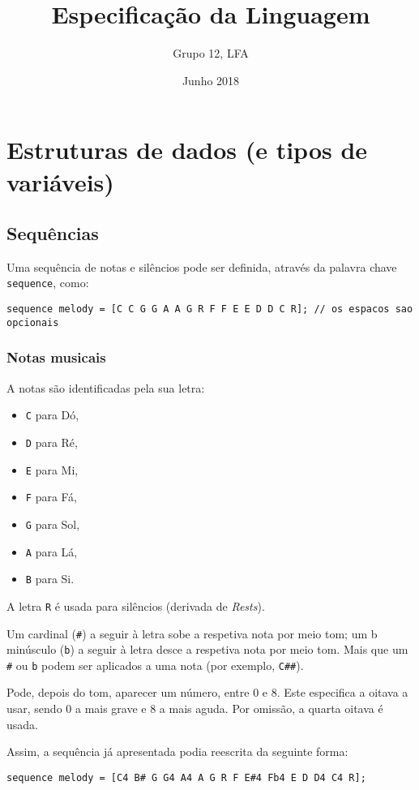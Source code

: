 \documentclass{article}
\title{Especificação da Linguagem}
\author{Grupo 12, LFA}
\date{Junho 2018}
\begin{document}
\maketitle

\tableofcontents
\vspace{2cm} %

\section{Estruturas de dados (e tipos de variáveis)} \label{variables}
\subsection{Sequências}
Uma sequência de notas e silêncios pode ser definida, através da palavra chave \texttt{sequence}, como:
\begin{lstlisting} 
sequence melody = [C C G G A A G R F F E E D D C R]; // os espacos sao opcionais
\end{lstlisting}

\subsubsection{Notas musicais}
A notas são identificadas pela sua letra:
\begin{itemize}
    \item \texttt{C} para Dó,
    \item \texttt{D} para Ré,
    \item \texttt{E} para Mi,
    \item \texttt{F} para Fá,
    \item \texttt{G} para Sol,
    \item \texttt{A} para Lá,
    \item \texttt{B} para Si.
\end{itemize}
A letra \texttt{R} é usada para silêncios (derivada de \textit{Rests}).

Um cardinal (\texttt{\#}) a seguir à letra sobe a respetiva nota por meio tom; um b minúsculo (\texttt{b}) a seguir à letra desce a respetiva nota por meio tom. Mais que um \texttt{\#} ou \texttt{b} podem ser aplicados a uma nota (por exemplo, \texttt{C\#\#}).

Pode, depois do tom, aparecer um número, entre 0 e 8. Este especifica a oitava a usar, sendo 0 a mais grave e 8 a mais aguda. Por omissão, a quarta oitava é usada.

Assim, a sequência já apresentada podia reescrita da seguinte forma:
\begin{lstlisting} 
sequence melody = [C4 B# G G4 A4 A G R F E#4 Fb4 E D D4 C4 R];
\end{lstlisting}
\end{document}
